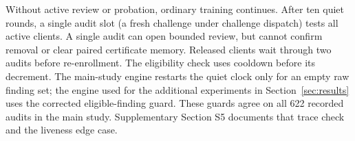 \documentclass[journal]{IEEEtran}
\begin{document}
Without active review or probation, ordinary training continues. After
ten quiet rounds, a single audit slot (a fresh challenge under challenge
dispatch) tests all active clients. A single
audit can open bounded review, but cannot confirm removal or clear
paired certificate memory. Released clients wait through two audits
before re-enrollment. The eligibility check uses cooldown before its
decrement. The main-study engine restarts the quiet clock only for an
empty raw finding set; the engine used for the additional experiments in
Section~\ref{sec:results} uses the corrected eligible-finding guard. These guards agree on all 622 recorded audits
in the main study. Supplementary Section S5 documents that trace check
and the liveness edge case.

\begin{figure}[t]
\centering

\end{figure}
\end{document}
